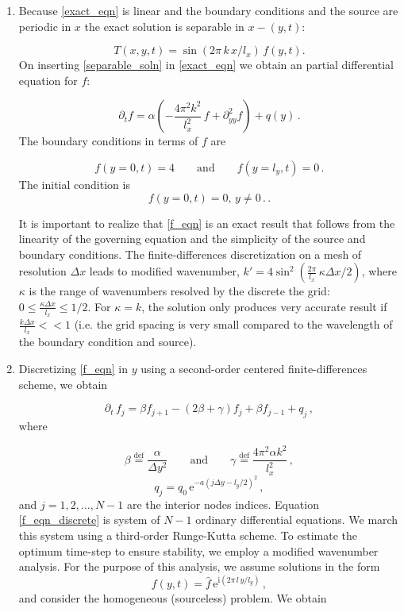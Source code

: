 \documentclass[11pt]{article}
\newcommand{\defn}{\stackrel{\text{def}}{=}}
\newcommand{\ii}{\mathrm{i}}
\newcommand{\ee}{\mathrm{e}}
\newcommand{\com}{\, ,}
\newcommand{\per}{\, .}
\def\beq{\begin{equation}}
\def\eeq{\end{equation}}
\begin{document}
\begin{enumerate}[label=(\alph*)]
    \item Because \eqref{exact_eqn} is linear and the  boundary conditions and the source are periodic in $x$ the exact solution is separable in $x-(y,t)$:

        \beq
        \label{separable_soln}
        T(x,y,t) = \sin\left(2\pi\,k\,x/l_x\right)\,f(y,t).
        \eeq
        On inserting \eqref{separable_soln} in \eqref{exact_eqn} we obtain an partial differential equation for $f$:

        \beq
        \label{f_eqn}
    \partial_t f = \alpha\left(-\frac{4\pi^2k^2}{l_x^2}\,f + \partial^2_{yy}f\right) + q(y)\per
        \eeq
        The boundary conditions in terms of $f$ are

        \beq
        \label{f_bc}
            f(y=0,t) = 4\qquad \text{and}\qquad f(y=l_y,t) = 0\per
        \eeq
        The initial condition is
        \beq
            f(y=0,t) = 0, \,y\neq0\per\per
        \eeq



        It is important to realize that \eqref{f_eqn} is an exact result that follows from the linearity of the governing equation and the simplicity of the source and boundary conditions. The finite-differences discretization on a mesh of resolution $\Delta x$ leads to modified wavenumber, $k'= 4\sin^2\left(\tfrac{2\pi}{l_x}\,\kappa\Delta x/2\right)$, where $\kappa$ is the range of wavenumbers resolved by the discrete the grid: $0\leq\tfrac{\kappa\Delta x}{l_x}\leq 1/2$. For $\kappa = k$, the solution only produces very accurate result if $\tfrac{k\Delta x}{l_x}<<1$ (i.e. the grid spacing is very small compared to the wavelength of the boundary condition and source).

    \item Discretizing \eqref{f_eqn} in $y$ using a second-order centered finite-differences scheme, we obtain

        \beq
            \label{f_eqn_discrete}
            \partial_t\,f_j = \beta f_{j+1} - \left(2\beta + \gamma\right)f_j + \beta f_{j-1} + q_j\com
        \eeq
        where

        \beq
        \label{beta_gamma_defn}
        \beta \defn \frac{\alpha}{\Delta y^2} \qquad\text{and}\qquad \gamma \defn \frac{4\pi^2\alpha k^2}{l_x^2}\com
        \eeq
        \beq
        q_j = q_0\,\ee^{-a(j\Delta y - l_y/2)^2}\com
        \eeq
        and $j=1,2,\ldots,N-1$ are the interior nodes indices. Equation \eqref{f_eqn_discrete} is system of $N-1$ ordinary differential equations. We march this system using a third-order Runge-Kutta scheme. To estimate the optimum time-step to ensure stability, we employ a modified wavenumber analysis. For the purpose of this analysis, we assume solutions in the form
        \beq
        f(y,t) = \hat{f}\,\ee^{\ii(2\pi\,l\,y/l_y)}\com
        \eeq
        and consider the homogeneous (sourceless) problem. We obtain


\end{enumerate}
\end{document}
